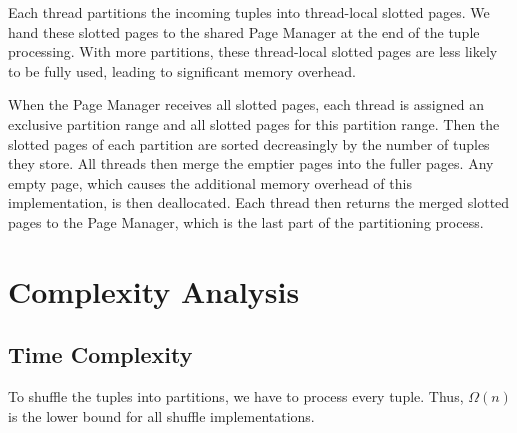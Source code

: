 Each thread partitions the incoming tuples into thread-local slotted pages.
We hand these slotted pages to the shared Page Manager at the end of the tuple processing.
With more partitions, these thread-local slotted pages are less likely to be fully used, leading to significant memory overhead.

When the Page Manager receives all slotted pages, each thread is assigned an exclusive partition range and all slotted pages for this partition range.
Then the slotted pages of each partition are sorted decreasingly by the number of tuples they store.
All threads then merge the emptier pages into the fuller pages.
Any empty page, which causes the additional memory overhead of this implementation, is then deallocated.
Each thread then returns the merged slotted pages to the Page Manager, which is the last part of the partitioning process.

\section{Complexity Analysis}
\subsection{Time Complexity}
To shuffle the tuples into partitions, we have to process every tuple.
Thus, $\Omega(n)$ is the lower bound for all shuffle implementations.
